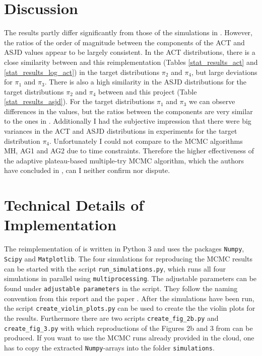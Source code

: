 \documentclass{scrartcl}
\begin{document}
    \section{Discussion}
    The results partly differ significantly from those of the simulations in \cite{lau2019}.
    However, the ratios of the order of magnitude between the components of the ACT and ASJD values appear to be largely consistent.
    In the ACT distributions, there is a close similarity between \cite{lau2019} and this reimplementation (Tables \ref{stat_results_act} and \ref{stat_results_log_act}) in the target distributions
    $\pi_2$ and $\pi_4$, but large deviations for $\pi_1$ and $\pi_3$. There is also a high similarity in the ASJD distributions for the target distributions $\pi_2$ and $\pi_4$
    between \cite{lau2019} and this project (Table \ref{stat_results_asjd}). For the target distributions $\pi_1$ and $\pi_3$ we can observe
    differences in the values, but the ratios between the components are very similar to the ones in \cite{lau2019}.
    Additionally I had the subjective impression that there were big variances in the ACT and ASJD distributions in experiments for the target distribution $\pi_4$.
    Unfortunately I could not compare to the MCMC algorithms MH, AG1 and AG2 \cite{lau2019} due to time constraints. Therefore
    the higher effectiveness of the adaptive plateau-based multiple-try MCMC algorithm, which the authors have concluded in \cite{lau2019},
    can I neither confirm nor dispute.


    \section{Technical Details of Implementation}
    The reimplementation of \cite{lau2019} is written in Python 3 and uses the packages \texttt{Numpy}, \texttt{Scipy}
    and \texttt{Matplotlib}. The four simulations for reproducing the MCMC results can be started with the script
    \texttt{run\_simulations.py}, which runs all four simulations in parallel using \texttt{multiprocessing}.
    The adjustable parameters can be found under \texttt{adjustable parameters} in the script. They follow the naming convention from this report
    and the paper \cite{lau2019}. After the simulations have been run, the script \texttt{create\_violin\_plots.py} can be used to create the
    the violin plots for the results. Furthermore there are two scripts \texttt{create\_fig\_2b.py}
    and \texttt{create\_fig\_3.py} with which reproductions of the Figures 2b and 3 from \cite{lau2019} can be produced.
    If you want to use the MCMC runs already provided in the cloud, one has to copy the extracted \texttt{Numpy}-arrays into the folder
    \texttt{simulations}.

    
    
\end{document}

